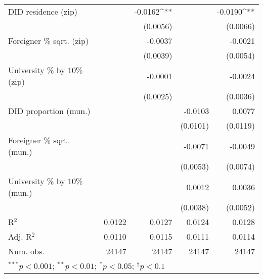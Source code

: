 \begin{tabular}{l D{.}{.}{5.11} D{.}{.}{5.7} D{.}{.}{5.11} D{.}{.}{5.7}}
DID residence (zip)               &                   & -0.0162^{**}  &                   & -0.0190^{**}  \\
                                  &                   & (0.0056)      &                   & (0.0066)      \\
Foreigner \% sqrt. (zip)          &                   & -0.0037       &                   & -0.0021       \\
                                  &                   & (0.0039)      &                   & (0.0054)      \\
University \% by 10\% (zip)       &                   & -0.0001       &                   & -0.0024       \\
                                  &                   & (0.0025)      &                   & (0.0036)      \\
DID proportion (mun.)             &                   &               & -0.0103           & 0.0077        \\
                                  &                   &               & (0.0101)          & (0.0119)      \\
Foreigner \% sqrt. (mun.)         &                   &               & -0.0071           & -0.0049       \\
                                  &                   &               & (0.0053)          & (0.0074)      \\
University \% by 10\% (mun.)      &                   &               & 0.0012            & 0.0036        \\
                                  &                   &               & (0.0038)          & (0.0052)      \\
\midrule
R$^2$                             & 0.0122            & 0.0127        & 0.0124            & 0.0128        \\
Adj. R$^2$                        & 0.0110            & 0.0115        & 0.0111            & 0.0114        \\
Num. obs.                         & 24147             & 24147         & 24147             & 24147         \\
\bottomrule
{}
\end{tabular}
